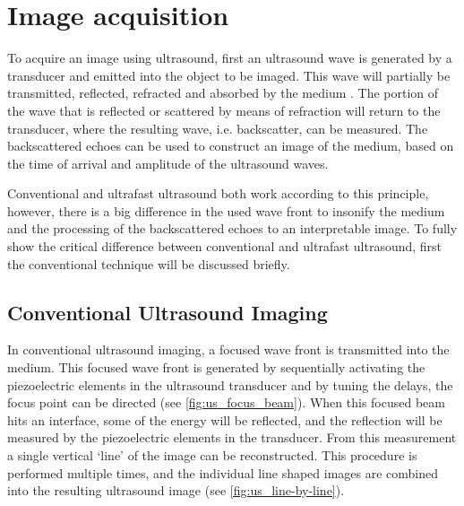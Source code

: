\section{Image acquisition}
To acquire an image using ultrasound, first an ultrasound wave is generated by a transducer and emitted into the object to be imaged. This wave will partially be transmitted, reflected, refracted and absorbed by the medium \cite{pillen_ultrasonography_2013}. The portion of the wave that is reflected or scattered by means of refraction will return to the transducer, where the resulting wave, i.e. backscatter, can be measured. The backscattered echoes can be used to construct an image of the medium, based on the time of arrival and amplitude of the ultrasound waves. 

Conventional and ultrafast ultrasound both work according to this principle, however, there is a big difference in the used wave front to insonify the medium and the processing of the backscattered echoes to an interpretable image. To fully show the critical difference between conventional and ultrafast ultrasound, first the conventional technique will be discussed briefly. 



\subsection{Conventional Ultrasound Imaging}
In conventional ultrasound imaging, a focused wave front is transmitted into the medium. This focused wave front is generated by sequentially activating the piezoelectric elements in the ultrasound transducer and by tuning the delays, the focus point can be directed (see \autoref{fig:us_focus_beam}). When this focused beam hits an interface, some of the energy will be reflected, and the reflection will be measured by the piezoelectric elements in the transducer. From this measurement a single vertical `line' of the image can be reconstructed. This procedure is performed multiple times, and the individual line shaped images are combined into the resulting ultrasound image (see \autoref{fig:us_line-by-line}). 


